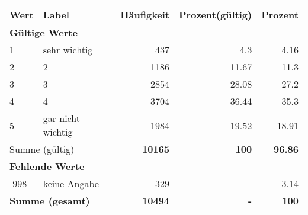      \begin{longtable}{lXrrr}
     \toprule
     \textbf{Wert} & \textbf{Label} & \textbf{Häufigkeit} & \textbf{Prozent(gültig)} & \textbf{Prozent} \\
     \endhead
     \midrule
     \multicolumn{5}{l}{\textbf{Gültige Werte}}\\

     1 &
     \multicolumn{1}{X}{ sehr wichtig   } &


       \num{437} &
       \num[round-mode=places,round-precision=2]{4,3} &
         \num[round-mode=places,round-precision=2]{4,16} \\

     2 &
     \multicolumn{1}{X}{ 2   } &


       \num{1186} &
       \num[round-mode=places,round-precision=2]{11,67} &
         \num[round-mode=places,round-precision=2]{11,3} \\

     3 &
     \multicolumn{1}{X}{ 3   } &


       \num{2854} &
       \num[round-mode=places,round-precision=2]{28,08} &
         \num[round-mode=places,round-precision=2]{27,2} \\

     4 &
     \multicolumn{1}{X}{ 4   } &


       \num{3704} &
       \num[round-mode=places,round-precision=2]{36,44} &
         \num[round-mode=places,round-precision=2]{35,3} \\

     5 &
     \multicolumn{1}{X}{ gar nicht wichtig   } &


       \num{1984} &
       \num[round-mode=places,round-precision=2]{19,52} &
         \num[round-mode=places,round-precision=2]{18,91} \\
     \midrule
     \multicolumn{2}{l}{Summe (gültig)} &
       \textbf{\num{10165}} &
     \textbf{100} &
       \textbf{\num[round-mode=places,round-precision=2]{96,86}} \\
     \multicolumn{5}{l}{\textbf{Fehlende Werte}}\\
       -998 &
       keine Angabe &
         \num{329} &
        - &
         \num[round-mode=places,round-precision=2]{3,14} \\
     \midrule
     \multicolumn{2}{l}{\textbf{Summe (gesamt)}} &
          \textbf{\num{10494}} &
        \textbf{-} &
        \textbf{100} \\
     \bottomrule
     \end{longtable}
     
